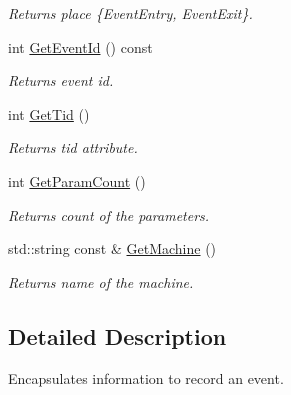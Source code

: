 \begin{DoxyCompactItemize}
\begin{DoxyCompactList}\small\item\em Returns place \{Event\-Entry, Event\-Exit\}. \end{DoxyCompactList}\item 
\hypertarget{class_common_1_1_event_a46985808c16eda5934a6f6506351727a}{int \hyperlink{class_common_1_1_event_a46985808c16eda5934a6f6506351727a}{Get\-Event\-Id} () const }\label{class_common_1_1_event_a46985808c16eda5934a6f6506351727a}

\begin{DoxyCompactList}\small\item\em Returns event id. \end{DoxyCompactList}\item 
\hypertarget{class_common_1_1_event_a9bdf8d9094f35739c9da78dd4e5fd51f}{int \hyperlink{class_common_1_1_event_a9bdf8d9094f35739c9da78dd4e5fd51f}{Get\-Tid} ()}\label{class_common_1_1_event_a9bdf8d9094f35739c9da78dd4e5fd51f}

\begin{DoxyCompactList}\small\item\em Returns tid attribute. \end{DoxyCompactList}\item 
\hypertarget{class_common_1_1_event_a5349c49a0cdb128a3f041914ad7e4079}{int \hyperlink{class_common_1_1_event_a5349c49a0cdb128a3f041914ad7e4079}{Get\-Param\-Count} ()}\label{class_common_1_1_event_a5349c49a0cdb128a3f041914ad7e4079}

\begin{DoxyCompactList}\small\item\em Returns count of the parameters. \end{DoxyCompactList}\item 
\hypertarget{class_common_1_1_event_acc26570c393a466b02cbb57178a5a251}{std\-::string const \& \hyperlink{class_common_1_1_event_acc26570c393a466b02cbb57178a5a251}{Get\-Machine} ()}\label{class_common_1_1_event_acc26570c393a466b02cbb57178a5a251}

\begin{DoxyCompactList}\small\item\em Returns name of the machine. \end{DoxyCompactList}\end{DoxyCompactItemize}


\subsection{Detailed Description}
Encapsulates information to record an event. 

